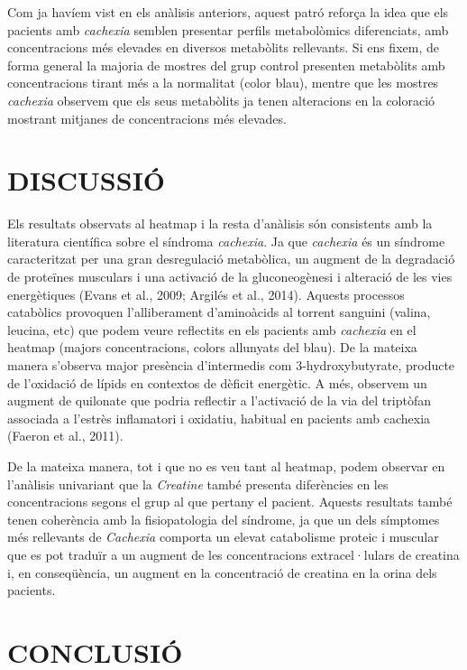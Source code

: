 \documentclass[
]{article}
\begin{document}
Com ja havíem vist en els anàlisis anteriors, aquest patró reforça la
idea que els pacients amb \emph{cachexia} semblen presentar perfils
metabolòmics diferenciats, amb concentracions més elevades en diversos
metabòlits rellevants. Si ens fixem, de forma general la majoria de
mostres del grup control presenten metabòlits amb concentracions tirant
més a la normalitat (color blau), mentre que les mostres \emph{cachexia}
observem que els seus metabòlits ja tenen alteracions en la coloració
mostrant mitjanes de concentracions més elevades.

\section{DISCUSSIÓ}\label{discussiuxf3}

Els resultats observats al heatmap i la resta d'anàlisis són consistents
amb la literatura científica sobre el síndroma \emph{cachexia}. Ja que
\emph{cachexia} és un síndrome caracteritzat per una gran desregulació
metabòlica, un augment de la degradació de proteïnes musculars i una
activació de la gluconeogènesi i alteració de les vies energètiques
(Evans et al., 2009; Argilés et al., 2014). Aquests processos catabòlics
provoquen l'alliberament d'aminoàcids al torrent sanguini (valina,
leucina, etc) que podem veure reflectits en els pacients amb
\emph{cachexia} en el heatmap (majors concentracions, colors allunyats
del blau). De la mateixa manera s'observa major presència d'intermedis
com 3-hydroxybutyrate, producte de l'oxidació de lípids en contextos de
dèficit energètic. A més, observem un augment de quilonate que podria
reflectir a l'activació de la via del triptòfan associada a l'estrès
inflamatori i oxidatiu, habitual en pacients amb cachexia (Faeron et
al., 2011).

De la mateixa manera, tot i que no es veu tant al heatmap, podem
observar en l'anàlisis univariant que la \emph{Creatine} també presenta
diferències en les concentracions segons el grup al que pertany el
pacient. Aquests resultats també tenen coherència amb la fisiopatologia
del síndrome, ja que un dels símptomes més rellevants de \emph{Cachexia}
comporta un elevat catabolisme proteic i muscular que es pot traduïr a
un augment de les concentracions extracel·lulars de creatina i, en
conseqüència, un augment en la concentració de creatina en la orina dels
pacients.

\section{CONCLUSIÓ}\label{conclusiuxf3}
\end{document}
